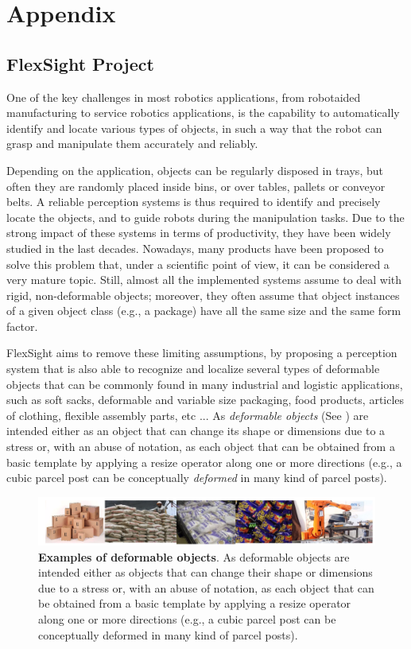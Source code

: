 \chapter{Appendix}\label{apx:appendix}

\section{FlexSight Project}\label{apx:flexsight}
One of the key challenges in most robotics applications, from robot­aided manufacturing to service robotics applications, is the capability to automatically identify and locate various types of objects, in such a way that the robot can grasp and manipulate them accurately and reliably.

Depending on the application, objects can be regularly disposed in trays, but often they are randomly placed inside bins, or over tables, pallets or conveyor belts. A reliable perception systems is thus required to identify and precisely locate the objects, and to guide robots during the manipulation tasks. Due to the strong impact of these systems in terms of productivity, they have been widely studied in the last decades. Nowadays, many products have been proposed to solve this problem that, under a scientific point of view, it can be considered a very mature topic. Still, almost all the implemented systems assume to deal with rigid, non-deformable objects; moreover, they often assume that object instances of a given object class (e.g., a package)  have all the same size and the same form factor.

FlexSight aims to remove these limiting assumptions, by proposing a perception system that is also able to recognize and localize several types of deformable objects that can be commonly found in many industrial and logistic applications, such as soft sacks, deformable and variable size packaging, food products, articles of clothing, flexible assembly parts, etc ... 
As \emph{deformable objects} (See ) are intended either as an object that can change its shape or dimensions due to a stress or, with an abuse of notation, as each object that can be obtained from a basic template by applying a resize operator along one or more directions (e.g., a cubic parcel post can be conceptually \emph{deformed} in many kind of parcel posts).

\begin{figure}
    \centering
    \includegraphics[width=\textwidth]{figures/Appendix/deformable_objects_ex.png}
    \caption{\textbf{Examples of deformable objects}. As deformable objects are intended either as objects that can change their shape or dimensions due to a stress or, with an abuse of notation, as each object that can be obtained from a basic template by applying a resize operator along one or more directions (e.g., a cubic parcel post can be conceptually deformed in many kind of parcel posts).} 
    \label{fig:deformable_objects_ex}
\end{figure}

